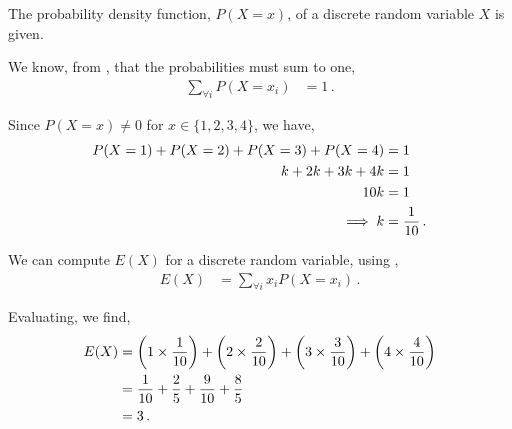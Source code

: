 %
%


\begin{subquestions}
	
\subquestion

The probability density function, $P(X=x)$, of a discrete random variable $X$ is given.

\begin{subsubquestions}
	
\subsubquestion

We know, from , that the probabilities must sum to one, 
\begin{align}
	\sum_{\forall i}P(X=x_i) & = 1 \,.
\end{align}

Since $P(X=x)\neq 0$ for $x\in \{ 1,2,3,4 \} $, we have,
\begin{align}
	P(X=1)+P(X=2)+P(X=3)+P(X=4) & = 1 \nonumber \\
	k+2k+3k+4k & = 1 \nonumber \\
	10k & = 1 \nonumber \\
	\implies k & = \frac{1}{10} \,.
\end{align}
	

\subsubquestion

We can compute $E(X)$ for a discrete random variable, using ,
\begin{align}
	E(X) & = \sum_{\forall i} x_i P(X=x_i) \,.
\end{align}

Evaluating, we find,
\begin{align}
	E(X) & = \left(1 \times \frac{1}{10}\right) + \left(2 \times \frac{2}{10}\right) + \left(3 \times \frac{3}{10}\right) + \left(4 \times \frac{4}{10}\right) \nonumber \\
	     & = \frac{1}{10} + \frac{2}{5} + \frac{9}{10} + \frac{8}{5} \nonumber \\
	     & = 3 \,.
\end{align}


\end{subsubquestions}
\end{subquestions}
